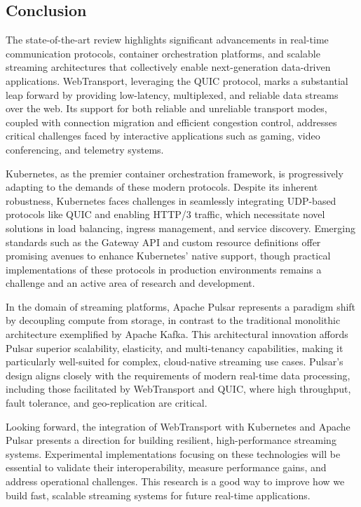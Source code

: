 \subsection{Conclusion}
The state-of-the-art review highlights significant advancements in real-time communication protocols, container orchestration platforms, and scalable streaming architectures that collectively enable next-generation data-driven applications. WebTransport, leveraging the QUIC protocol, marks a substantial leap forward by providing low-latency, multiplexed, and reliable data streams over the web. Its support for both reliable and unreliable transport modes, coupled with connection migration and efficient congestion control, addresses critical challenges faced by interactive applications such as gaming, video conferencing, and telemetry systems.

Kubernetes, as the premier container orchestration framework, is progressively adapting to the demands of these modern protocols. Despite its inherent robustness, Kubernetes faces challenges in seamlessly integrating UDP-based protocols like QUIC and enabling HTTP/3 traffic, which necessitate novel solutions in load balancing, ingress management, and service discovery. Emerging standards such as the Gateway API and custom resource definitions offer promising avenues to enhance Kubernetes' native support, though practical implementations of these protocols in production environments remains a challenge and an active area of research and development.

In the domain of streaming platforms, Apache Pulsar represents a paradigm shift by decoupling compute from storage, in contrast to the traditional monolithic architecture exemplified by Apache Kafka. This architectural innovation affords Pulsar superior scalability, elasticity, and multi-tenancy capabilities, making it particularly well-suited for complex, cloud-native streaming use cases. Pulsar's design aligns closely with the requirements of modern real-time data processing, including those facilitated by WebTransport and QUIC, where high throughput, fault tolerance, and geo-replication are critical.

Looking forward, the integration of WebTransport with Kubernetes and Apache Pulsar presents a direction for building resilient, high-performance streaming systems. Experimental implementations focusing on these technologies will be essential to validate their interoperability, measure performance gains, and address operational challenges. This research is a good way to improve how we build fast, scalable streaming systems for future real-time applications.

